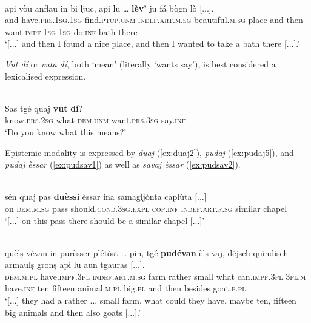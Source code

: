 \ea
\label{ex:vul2}
\\
\gll  [...] api vòu anflau in bi ljuc, api lu … \textbf{lèv’} ju fá bògn lò [...].\\
{} and have.\textsc{prs.1sg.1sg} find.\textsc{ptcp.unm} \textsc{indef.art.m.sg} beautiful.\textsc{m.sg} place and then {} want.\textsc{impf.1sg} \textsc{1sg} do.\textsc{inf} bath there\\
\glt `[...] and then I found a nice place, and then I wanted to take a bath there [...].'
\z

\textit{Vut dí} or \textit{vuta dí}, both `mean'  (literally `wants say'), is best considered a lexicalised expression.

\ea
\label{ex:vutdi1}
\\
\gll Sas tgé quaj \textbf{vut} \textbf{dí}?   \\
know.\textsc{prs.2sg} what \textsc{dem.unm} want.\textsc{prs.3sg} say.\textsc{inf}\\
\glt `Do you know what this means?'
\z

Epistemic modality is expressed by \textit{duaj}  (\ref{ex:duaj2}), \textit{pudaj} (\ref{ex:pudaj5}), and \textit{pudaj èssar} (\ref{ex:pudsav1}) as well as \textit{savaj èssar} (\ref{ex:pudsav2}).

\ea
\label{ex:duaj2}
\\
\gll   [...] sén quaj pas \textbf{duèssi} èssar ina samagljònta caplùta [...] \\
{} on \textsc{dem.m.sg} pass should.\textsc{cond.3sg.expl} \textsc{cop.inf} \textsc{indef.art.f.sg} similar chapel\\
\glt `[...] on this pass there should be a similar chapel [...]'
\z

\ea
\label{ex:pudaj5}
\\
\gll   [...] quèlṣ vèvan in purèsser plétòst … pin, tgé \textbf{pudévan} èlṣ vaj, déjsch quindiṣch armaulṣ gronṣ api lu aun tgauras [...]. \\
{} \textsc{dem.m.pl} have.\textsc{impf.3pl} \textsc{indef.art.m.sg} farm rather {} small what can.\textsc{impf.3pl} \textsc{3pl.m} have.\textsc{inf} ten fifteen animal.\textsc{m.pl} big.\textsc{pl} and then besides goat.\textsc{f.pl}\\
\glt `[...] they had a rather ... small farm, what could they have, maybe ten, fifteen big animals and then also goats [...].'
\z

